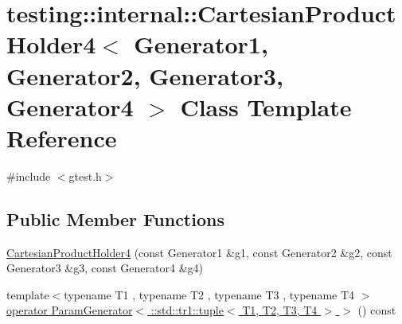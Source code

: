 \hypertarget{classtesting_1_1internal_1_1_cartesian_product_holder4}{\section{testing\-:\-:internal\-:\-:Cartesian\-Product\-Holder4$<$ Generator1, Generator2, Generator3, Generator4 $>$ Class Template Reference}
\label{classtesting_1_1internal_1_1_cartesian_product_holder4}
}


{\ttfamily \#include $<$gtest.\-h$>$}

\subsection*{Public Member Functions}
\begin{DoxyCompactItemize}
\item 
\hyperlink{classtesting_1_1internal_1_1_cartesian_product_holder4_a07fe92a091d7717a159d7ba5f2fe3c75}{Cartesian\-Product\-Holder4} (const Generator1 \&g1, const Generator2 \&g2, const Generator3 \&g3, const Generator4 \&g4)
\item 
{\footnotesize template$<$typename T1 , typename T2 , typename T3 , typename T4 $>$ }\\\hyperlink{classtesting_1_1internal_1_1_cartesian_product_holder4_a6cd9d04e5e62c3fe810f1909ebd21c59}{operator Param\-Generator$<$ \-::std\-::tr1\-::tuple$<$ T1, T2, T3, T4 $>$ $>$} () const 
\end{DoxyCompactItemize}


